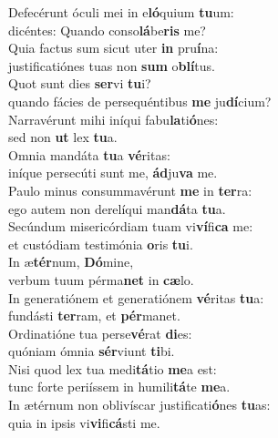 \evenverse Defecérunt óculi mei in e\textbf{ló}quium \textbf{tu}um:~\*\\
\evenverse dicéntes: Quando conso\textbf{lá}be\textbf{ris} me?\\
\oddverse Quia factus sum sicut uter \textbf{in} pru\textbf{í}na:~\*\\
\oddverse justificatiónes tuas non \textbf{sum} o\textbf{blí}tus.\\
\evenverse Quot sunt dies \textbf{ser}vi \textbf{tu}i?~\*\\
\evenverse quando fácies de persequéntibus \textbf{me} ju\textbf{dí}cium?\\
\oddverse Narravérunt mihi iníqui fabu\textbf{la}ti\textbf{ó}nes:~\*\\
\oddverse sed non \textbf{ut} lex \textbf{tu}a.\\
\evenverse Omnia mandáta \textbf{tu}a \textbf{vé}ritas:~\*\\
\evenverse iníque persecúti sunt me, \textbf{ád}ju\textbf{va} me.\\
\oddverse Paulo minus consummavérunt \textbf{me} in \textbf{ter}ra:~\*\\
\oddverse ego autem non derelíqui man\textbf{dá}ta \textbf{tu}a.\\
\evenverse Secúndum misericórdiam tuam vi\textbf{ví}fi\textbf{ca} me:~\*\\
\evenverse et custódiam testimónia \textbf{o}ris \textbf{tu}i.\\
\oddverse In æ\textbf{tér}num, \textbf{Dó}mine,~\*\\
\oddverse verbum tuum pérma\textbf{net} in \textbf{cæ}lo.\\
\evenverse In generatiónem et generatiónem \textbf{vé}ritas \textbf{tu}a:~\*\\
\evenverse fundásti \textbf{ter}ram, et \textbf{pér}manet.\\
\oddverse Ordinatióne tua perse\textbf{vé}rat \textbf{di}es:~\*\\
\oddverse quóniam ómnia \textbf{sér}viunt \textbf{ti}bi.\\
\evenverse Nisi quod lex tua medi\textbf{tá}tio \textbf{me}a est:~\*\\
\evenverse tunc forte periíssem in humili\textbf{tá}te \textbf{me}a.\\
\oddverse In ætérnum non oblivíscar justificati\textbf{ó}nes \textbf{tu}as:~\*\\
\oddverse quia in ipsis vi\textbf{vi}fi\textbf{cá}sti me.\\
